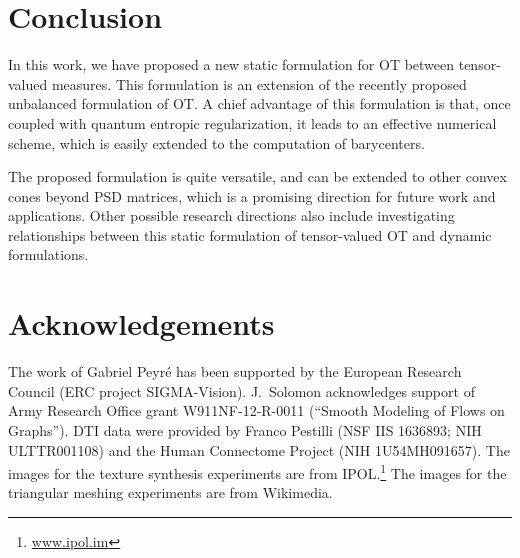 
\section{Conclusion}

In this work, we have proposed a new static formulation for OT between tensor-valued measures. This formulation is an extension of the recently proposed unbalanced formulation of OT. A chief advantage of this formulation is that, once coupled with quantum entropic regularization, it leads to an effective numerical scheme, which is easily extended to the computation of barycenters. 

The proposed formulation is quite versatile, and can be extended to other convex cones beyond PSD matrices, which is a promising direction for future work and applications.
%
Other possible research directions also include investigating relationships between this static formulation of tensor-valued OT and dynamic formulations. 

\section*{Acknowledgements}

The work of Gabriel Peyr\'e has been supported by the European Research Council (ERC project SIGMA-Vision). 
%
J.\ Solomon acknowledges support of Army Research Office grant W911NF-12-R-0011 (``Smooth Modeling of Flows on Graphs'').
%
DTI data were provided by Franco Pestilli (NSF IIS 1636893; NIH ULTTR001108) and the Human Connectome Project (NIH 1U54MH091657). 
%
The images for the texture synthesis experiments are from IPOL.\footnote{\url{www.ipol.im}}
% 
The images for the triangular meshing experiments are from Wikimedia.
